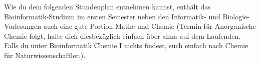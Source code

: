 Wie du dem folgenden Stundenplan entnehmen kannst, enthält das Bioinformatik-Studium im ersten
Semester neben den Informatik- und Biologie-Vorlesungen auch eine gute Portion Mathe und Chemie (Termin für Anorganische Chemie folgt, halte dich diesbezüglich einfach über alma auf dem Laufenden. Falls du unter Bioinformatik Chemie I nichts findest, such einfach nach Chemie für Naturwissenschaftler.).\\
\noindent\makebox[\textwidth][c]{%
	\setlength{\fboxrule}{4pt}
		\fcolorbox{red}{white}{
				\begin{minipage}[t]{
					\textwidth}\textbf{Achtung!} Die Daten für die Vorlesungstermine können sich noch ändern. Schau am besten auf Alma (\url{https://alma.uni-tuebingen.de/}), ob die Termine dort geupdatet wurden.
				\end{minipage}}}

